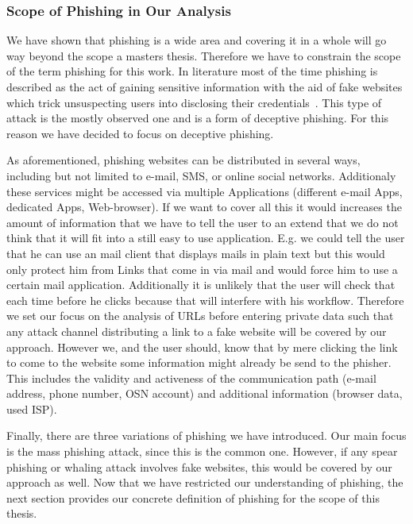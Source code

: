\subsubsection{Scope of Phishing in Our Analysis}
\label{s:scope}
We have shown that phishing is a wide area and covering it in a whole will go way beyond the scope a masters thesis. Therefore we have to constrain the scope of the term phishing for this work.
 In literature most of the time phishing is described as the act of gaining sensitive information with the aid of fake websites which trick unsuspecting users into disclosing their credentials~\cite{sheng2007antiphishingphil, antiphishingtrendreport2013, kasperskyreport2013}.
This type of attack is the mostly observed one and is a form of deceptive phishing.
 For this reason we have decided to focus on deceptive phishing.
 
 As aforementioned, phishing websites can be distributed in several ways, including but not limited to e-mail, SMS, or online social networks.
 Additionaly these services might be accessed via multiple Applications (different e-mail Apps, dedicated Apps, Web-browser).
 If we want to cover all this it would increases the amount of information that we have to tell the user to an extend that we do not think that it will fit into a still easy to use application.
 E.g. we could tell the user that he can use an mail client that displays mails in plain text but this would only protect him from Links that come in via mail and would force him to use a certain mail application. Additionally it is unlikely that the user will check that each time before he clicks because that will interfere with his workflow.
 Therefore we set our focus on the analysis of URLs before entering private data such that any attack channel distributing a link to a fake website will be covered by our approach.
 However we, and the user should, know that by mere clicking the link to come to the website some information might already be send to the phisher.
 This includes the validity and activeness of the communication path (e-mail address, phone number, OSN account) and additional information (browser data, used ISP).
 
  Finally, there are three variations of phishing we have introduced.
 Our main focus is the mass phishing attack, since this is the common one.
 However, if any spear phishing or whaling attack involves fake websites, this would be covered by our approach as well.
Now that we have restricted our understanding of phishing, the next section provides our concrete definition of phishing for the scope of this thesis.

